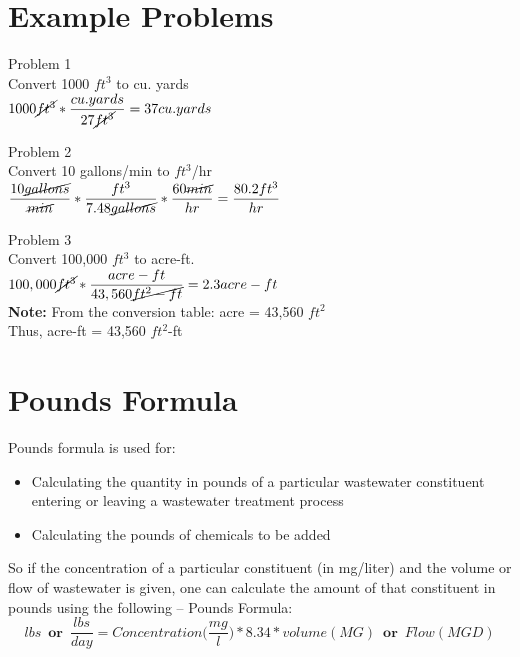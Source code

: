 \section{Example Problems}
Problem 1\\
Convert 1000 $ft^3$ to cu. yards\\

$1000 \cancel{ft^3}*\dfrac{cu.yards}{27\cancel{ft^3}} = 37 cu.yards$

Problem 2\\
Convert 10 gallons/min to $ft^3$/hr\\

$\dfrac{10 \cancel{gallons}}{\cancel{min}}*  \dfrac{ft^3}{7.48 \cancel{gallons}}  * \dfrac{60 \cancel{min}}{hr}   = \dfrac{80.2ft^3}{hr}$


Problem 3\\
Convert 100,000 $ft^3$ to acre-ft.\\
$100,000 \cancel{ft^3} * \dfrac{acre-ft}{43,560 \cancel{ft^2-ft}} =  2.3 acre-ft$\\
\textbf{Note:} From the conversion table: acre = 43,560 $ft^2$\\
Thus, acre-ft  = 43,560 $ft^2$-ft\\

\section{Pounds Formula}

Pounds formula is used for:
\begin{itemize}
\item Calculating the quantity in pounds of a particular wastewater constituent entering or leaving a wastewater treatment process
\item Calculating the pounds of chemicals to be added\\
\end{itemize}
So if the concentration of a particular constituent (in mg/liter) and the volume or flow of wastewater is given, one can calculate the amount of that constituent in pounds using the following – Pounds Formula:
$$lbs \enspace \textbf{or} \enspace \dfrac{lbs}{day}=Concentration\Big(\frac{mg}{l}\Big)*8.34*volume(MG) \enspace \textbf{or} \enspace Flow (MGD)$$\\

